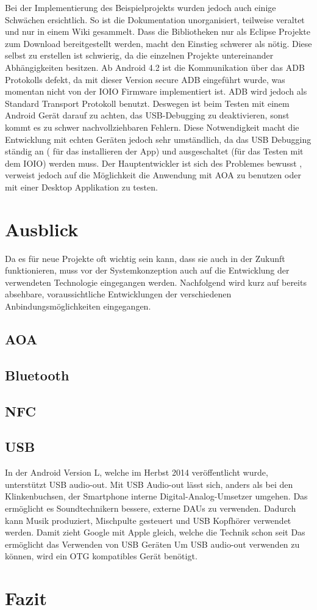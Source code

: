 \documentclass[12pt,journal,compsoc]{IEEEtran}
\begin{document}
Bei der Implementierung des Beispielprojekts wurden jedoch auch einige Schwächen ersichtlich.
So ist die Dokumentation unorganisiert, teilweise veraltet und nur in einem Wiki gesammelt.
Dass die Bibliotheken nur als Eclipse Projekte zum Download bereitgestellt werden, macht den Einstieg schwerer als nötig. Diese selbst zu erstellen ist schwierig, da die einzelnen Projekte untereinander Abhängigkeiten besitzen.
Ab Android 4.2 ist die Kommunikation über das ADB Protokolls defekt, da mit dieser Version secure ADB eingeführt wurde, was momentan nicht von der IOIO Firmware implementiert ist. ADB wird jedoch als Standard Transport Protokoll benutzt.
Deswegen ist beim Testen mit einem Android Gerät darauf zu achten, das USB-Debugging zu deaktivieren, sonst kommt es zu schwer nachvollziehbaren Fehlern.
Diese Notwendigkeit macht die Entwicklung mit echten Geräten jedoch sehr umständlich, da das USB Debugging ständig an ( für das installieren der App) und ausgeschaltet (für das Testen mit dem IOIO) werden muss.
Der Hauptentwickler ist sich des Problemes bewusst \cite{adbbroken}, verweist jedoch auf die Möglichkeit die Anwendung mit AOA zu benutzen oder mit einer Desktop Applikation zu testen. 

\section{Ausblick}
Da es für neue Projekte oft wichtig sein kann, dass sie auch in der Zukunft funktionieren, muss vor der Systemkonzeption auch auf die Entwicklung der verwendeten Technologie eingegangen werden.
Nachfolgend wird kurz auf bereits absehbare, voraussichtliche Entwicklungen der verschiedenen Anbindungsmöglichkeiten eingegangen. 
\subsection{AOA}

\subsection{Bluetooth}

\subsection{NFC}

\subsection{USB}
In der Android Version L, welche im Herbst 2014 veröffentlicht wurde, unterstützt USB audio-out. Mit USB Audio-out lässt sich, anders als bei den Klinkenbuchsen, der Smartphone interne Digital-Analog-Umsetzer umgehen. Das ermöglicht es Soundtechnikern bessere, externe DAUs zu verwenden.
Dadurch kann Musik produziert, Mischpulte gesteuert und USB Kopfhörer verwendet werden.
Damit zieht Google mit Apple gleich, welche die Technik schon seit 
Das ermöglicht das Verwenden von USB Geräten  
Um USB audio-out verwenden zu können, wird ein OTG kompatibles Gerät benötigt.

\section{Fazit}









\nocite{*}
\end{document}
